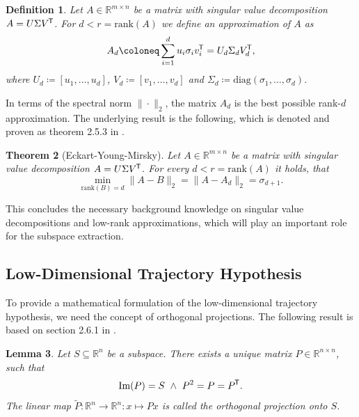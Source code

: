 \documentclass[11pt, a4paper]{article}
\newtheorem{theorem}{Theorem}[section]
\newtheorem{lemma}[theorem]{Lemma}
\newtheorem{definition}[theorem]{Definition}
\newcommand{\R}{\mathbb{R}}
\newcommand*{\tr}{^{\mkern-1.5mu\mathsf{T}}}
\begin{document}
\begin{definition} \label{def:rank}
Let $A \in \R^{m \times n}$ be a matrix with singular value decomposition $A=U \Sigma V\tr $. For $d < r = \text{rank}(A)$ we define an approximation of $A$ as
\[ A_d \coloneq \sum_{i=1}^{d} u_i \sigma_i v_i\tr  = U_d \Sigma_d V_d \tr , \]
where $U_d \coloneq [u_1, \dots, u_d]$, $V_d \coloneq [v_1, \dots, v_d]$ and $\Sigma_d \coloneq \text{diag}(\sigma_1, \dots, \sigma_d)$.
\end{definition}

In terms of the spectral norm $\| \cdot \|_2$, the matrix $A_d$ is the best possible rank-$d$ approximation. The underlying result is the following, which is denoted and proven as theorem 2.5.3 in \cite{SVD}.

\begin{theorem}[Eckart-Young-Mirsky] \label{thm:eym}
Let $A \in \R^{m \times n}$ be a matrix with singular value decomposition $A= U \Sigma V\tr $. For every $d < r = \text{rank}(A)$ it holds, that
\[ \min_{\text{rank}(B)=d} \big \| A-B \big \|_2 = \big \| A - A_d \big \|_2 = \sigma_{d+1}. \]
\end{theorem}

This concludes the necessary background knowledge on singular value decompositions and low-rank approximations, which will play an important role for the subspace extraction.

\subsection{Low-Dimensional Trajectory Hypothesis}

To provide a mathematical formulation of the low-dimensional trajectory hypothesis, we need the concept of orthogonal projections. The following result is based on section 2.6.1 in \cite{SVD}.

\begin{lemma} \label{lem:orthProjection}
Let $S \subseteq \R^n$ be a subspace. There exists a unique matrix $P \in \R^{n \times n}$, such that
\[ \text{Im}(P) = S \ \wedge \ P^2 = P = P\tr . \]
 The linear map $\tilde{P} : \R^n \to \R^n : x \mapsto Px$ is called the orthogonal projection onto $S$.
\end{lemma}
\end{document}
